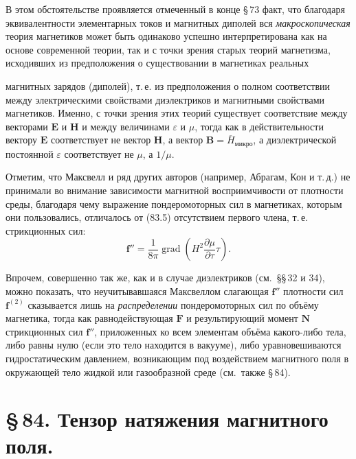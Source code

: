\documentclass[a4paper,12pt]{article}
\begin{document}
В этом обстоятельстве проявляется отмеченный в конце §\,73 факт,
что благодаря эквивалентности элементарных токов и магнитных диполей
вся \textit{макроскопическая} теория магнетиков может быть одинаково
успешно интерпретирована как на основе современной теории, так и с
точки зрения старых теорий магнетизма, исходивших из предположения
о существовании в магнетиках реальных


магнитных зарядов (диполей), т.\,е. из предположения о полном
соответствии между электрическими свойствами диэлектриков и магнитными
свойствами магнетиков. Именно, с точки зрения этих теорий существует
соответствие между векторами $\mathbf{E}$ и $\mathbf{H}$ и между
величинами $\varepsilon$ и $\mu$, тогда как в действительности вектору
$\mathbf{E}$ соответствует не вектор $\mathbf{H}$, а вектор
$\mathbf{B} = \overline{H}_{\text{микро}}$, а диэлектрической постоянной
$\varepsilon$ соответствует не $\mu$, а $1/\mu$.

Отметим, что Максвелл и ряд других авторов (например, Абрагам, Кон
и т.\,д.) не принимали во внимание зависимости магнитной восприимчивости
от плотности среды, благодаря чему выражение пондеромоторных сил
в магнетиках, которым они пользовались, отличалось от (83.5) отсутствием
первого члена, т.\,е. стрикционных сил:
\begin{equation}
    \mathbf{f}'' = \frac{1}{8\pi}\operatorname{grad}\!\left(
        H^2\frac{\partial\mu}{\partial\tau}\tau
    \right).
    \tag{83.6}
\end{equation}

Впрочем, совершенно так же, как и в случае диэлектриков (см.\ §§\,32
и 34), можно показать, что неучитывавшаяся Максвеллом слагающая
$\mathbf{f}''$ плотности сил $\mathbf{f}^{(2)}$ сказывается лишь на
\textit{распределении} пондеромоторных сил по объёму магнетика, тогда
как равнодействующая $\mathbf{F}$ и результирующий момент $\mathbf{N}$
стрикционных сил $\mathbf{f}''$, приложенных ко всем элементам объёма
какого-либо тела, либо равны нулю (если это тело находится в вакууме),
либо уравновешиваются гидростатическим давлением, возникающим под
воздействием магнитного поля в окружающей тело жидкой или газообразной
среде (см.\ также §\,84).


\section*{\S\,84. Тензор натяжения магнитного поля.}
\end{document}
